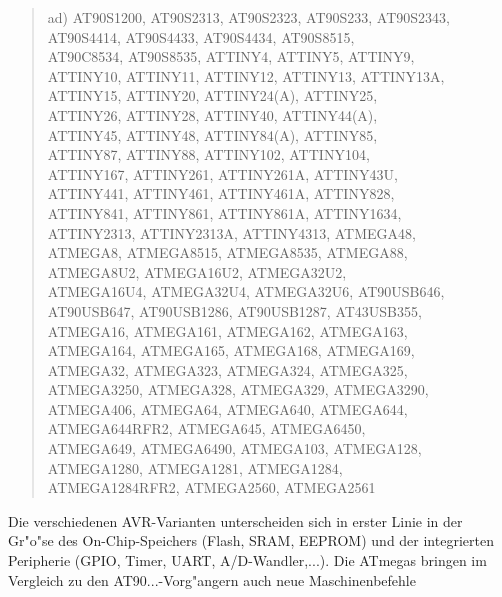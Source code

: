 \documentclass[12pt,a4paper,twoside]{report}
\begin{document}
\begin{quote}
ad) AT90S1200, AT90S2313, AT90S2323, AT90S233, AT90S2343,\\
    AT90S4414, AT90S4433, AT90S4434, AT90S8515,\\
    AT90C8534, AT90S8535, ATTINY4, ATTINY5, ATTINY9,\\
    ATTINY10, ATTINY11, ATTINY12, ATTINY13, ATTINY13A,\\
    ATTINY15, ATTINY20, ATTINY24(A), ATTINY25,\\
    ATTINY26, ATTINY28, ATTINY40, ATTINY44(A),\\
    ATTINY45, ATTINY48, ATTINY84(A), ATTINY85,\\
    ATTINY87, ATTINY88, ATTINY102, ATTINY104,\\
    ATTINY167, ATTINY261, ATTINY261A, ATTINY43U,\\
    ATTINY441, ATTINY461, ATTINY461A, ATTINY828,\\
    ATTINY841, ATTINY861, ATTINY861A, ATTINY1634,\\
    ATTINY2313, ATTINY2313A, ATTINY4313, ATMEGA48,\\
    ATMEGA8, ATMEGA8515, ATMEGA8535, ATMEGA88,\\
    ATMEGA8U2, ATMEGA16U2, ATMEGA32U2,\\
    ATMEGA16U4, ATMEGA32U4, ATMEGA32U6, AT90USB646,\\
    AT90USB647, AT90USB1286, AT90USB1287, AT43USB355,\\
    ATMEGA16, ATMEGA161, ATMEGA162, ATMEGA163,\\
    ATMEGA164, ATMEGA165, ATMEGA168, ATMEGA169,\\
    ATMEGA32, ATMEGA323, ATMEGA324, ATMEGA325,\\
    ATMEGA3250, ATMEGA328, ATMEGA329, ATMEGA3290,\\
    ATMEGA406, ATMEGA64, ATMEGA640, ATMEGA644,\\
    ATMEGA644RFR2, ATMEGA645, ATMEGA6450,\\
    ATMEGA649, ATMEGA6490, ATMEGA103, ATMEGA128,\\
    ATMEGA1280, ATMEGA1281, ATMEGA1284,\\
    ATMEGA1284RFR2, ATMEGA2560, ATMEGA2561
\end{quote}
Die verschiedenen AVR-Varianten unterscheiden sich in erster Linie in
der Gr"o"se des On-Chip-Speichers (Flash, SRAM, EEPROM) und der integrierten
Peripherie (GPIO, Timer, UART, A/D-Wandler,...).  Die ATmegas bringen im
Vergleich zu den AT90...-Vorg"angern auch neue Maschinenbefehle
\end{document}
